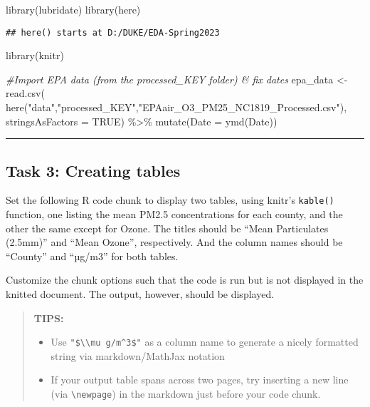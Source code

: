 \documentclass[
]{article}
\newenvironment{Shaded}{\begin{snugshade}}{\end{snugshade}}
\newcommand{\AttributeTok}[1]{\textcolor[rgb]{0.77,0.63,0.00}{#1}}
\newcommand{\CommentTok}[1]{\textcolor[rgb]{0.56,0.35,0.01}{\textit{#1}}}
\newcommand{\ConstantTok}[1]{\textcolor[rgb]{0.00,0.00,0.00}{#1}}
\newcommand{\FunctionTok}[1]{\textcolor[rgb]{0.00,0.00,0.00}{#1}}
\newcommand{\NormalTok}[1]{#1}
\newcommand{\OtherTok}[1]{\textcolor[rgb]{0.56,0.35,0.01}{#1}}
\newcommand{\SpecialCharTok}[1]{\textcolor[rgb]{0.00,0.00,0.00}{#1}}
\newcommand{\StringTok}[1]{\textcolor[rgb]{0.31,0.60,0.02}{#1}}
\begin{document}
\begin{Shaded}
\begin{Highlighting}[]
\FunctionTok{library}\NormalTok{(lubridate)}
\FunctionTok{library}\NormalTok{(here)}
\end{Highlighting}
\end{Shaded}

\begin{verbatim}
## here() starts at D:/DUKE/EDA-Spring2023
\end{verbatim}

\begin{Shaded}
\begin{Highlighting}[]
\FunctionTok{library}\NormalTok{(knitr)}

\CommentTok{\#Import EPA data (from the processed\_KEY folder) \& fix dates}
\NormalTok{epa\_data }\OtherTok{\textless{}{-}} \FunctionTok{read.csv}\NormalTok{(}
  \FunctionTok{here}\NormalTok{(}\StringTok{"data"}\NormalTok{,}\StringTok{"processed\_KEY"}\NormalTok{,}\StringTok{"EPAair\_O3\_PM25\_NC1819\_Processed.csv"}\NormalTok{),}
  \AttributeTok{stringsAsFactors =} \ConstantTok{TRUE}\NormalTok{) }\SpecialCharTok{\%\textgreater{}\%} 
  \FunctionTok{mutate}\NormalTok{(}\AttributeTok{Date =} \FunctionTok{ymd}\NormalTok{(Date))}
\end{Highlighting}
\end{Shaded}

\begin{center}\rule{0.5\linewidth}{0.5pt}\end{center}

\hypertarget{task-3-creating-tables}{%
\subsection{Task 3: Creating tables}\label{task-3-creating-tables}}

Set the following R code chunk to display two tables, using knitr's
\texttt{kable()} function, one listing the mean PM2.5 concentrations for
each county, and the other the same except for Ozone. The titles should
be ``Mean Particulates (2.5mm)'' and ``Mean Ozone'', respectively. And
the column names should be ``County'' and ``µg/m3'' for both tables.

Customize the chunk options such that the code is run but is not
displayed in the knitted document. The output, however, should be
displayed.

\begin{quote}
\textbf{TIPS:}

\begin{itemize}
\item
  Use \texttt{"\$\textbackslash{}\textbackslash{}mu\ g/m\^{}3\$"} as a
  column name to generate a nicely formatted string via markdown/MathJax
  notation
\item
  If your output table spans across two pages, try inserting a new line
  (via \texttt{\textbackslash{}newpage}) in the markdown just before
  your code chunk.
\end{itemize}
\end{quote}
\end{document}

